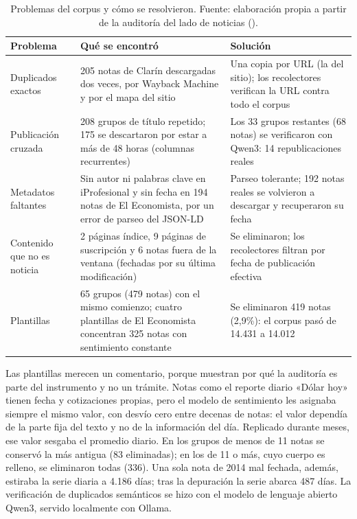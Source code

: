 \begin{table}[H]
\centering\small
\begin{tabularx}{\linewidth}{@{}L{3.4cm}YY@{}}
\toprule
\textbf{Problema} & \textbf{Qué se encontró} & \textbf{Solución} \\
\midrule
Duplicados exactos & 205 notas de Clarín descargadas dos veces, por Wayback Machine y por el mapa del sitio & Una copia por URL (la del sitio); los recolectores verifican la URL contra todo el corpus \\
Publicación cruzada & 208 grupos de título repetido; 175 se descartaron por estar a más de 48 horas (columnas recurrentes) & Los 33 grupos restantes (68 notas) se verificaron con Qwen3: 14 republicaciones reales \\
Metadatos faltantes & Sin autor ni palabras clave en iProfesional y sin fecha en 194 notas de El Economista, por un error de parseo del JSON-LD & Parseo tolerante; 192 notas reales se volvieron a descargar y recuperaron su fecha \\
Contenido que no es noticia & 2 páginas índice, 9 páginas de suscripción y 6 notas fuera de la ventana (fechadas por su última modificación) & Se eliminaron; los recolectores filtran por fecha de publicación efectiva \\
Plantillas & 65 grupos (479 notas) con el mismo comienzo; cuatro plantillas de El Economista concentran 325 notas con sentimiento constante & Se eliminaron 419 notas (2,9\%): el corpus pasó de 14.431 a 14.012 \\
\bottomrule
\end{tabularx}
\caption{Problemas del corpus y cómo se resolvieron. Fuente: elaboración propia a partir de
la auditoría del lado de noticias ().}
\label{tab:depuracion}
\end{table}

Las plantillas merecen un comentario, porque muestran por qué la auditoría es parte del
instrumento y no un trámite. Notas como el reporte diario «Dólar hoy» tienen fecha y
cotizaciones propias, pero el modelo de sentimiento les asignaba siempre el mismo valor, con
desvío cero entre decenas de notas: el valor dependía de la parte fija del texto y no de la
información del día. Replicado durante meses, ese valor sesgaba el promedio diario. En los
grupos de menos de 11 notas se conservó la más antigua (83 eliminadas); en los de 11 o más,
cuyo cuerpo es relleno, se eliminaron todas (336). Una sola nota de 2014 mal fechada, además,
estiraba la serie diaria a 4.186 días; tras la depuración la serie abarca 487 días. La
verificación de duplicados semánticos se hizo con el modelo de lenguaje abierto Qwen3, servido
localmente con Ollama.

